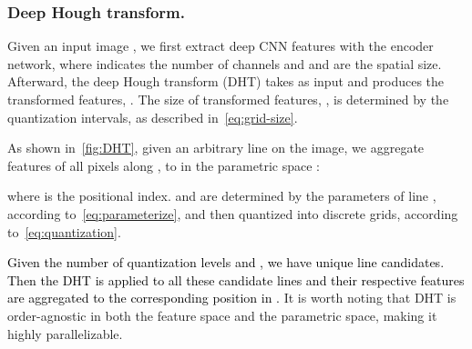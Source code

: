 \documentclass[10pt,journal,cspaper,compsoc]{IEEEtran}
\newcommand{\revise}[1]{{\textcolor{black}{#1}}}
\newcommand{\CheckRmv}[1]{}
\newcommand{\CheckRmv}[1]{#1}
\begin{document}
\CheckRmv{
\begin{figure*}[tb]
  \centering
  \hfill
  \subfigure[]{
    \label{fig:DHT}
    \begin{overpic}[height=.18\linewidth]{figures/dht.pdf}
\put(-5, 19){}
      \put(15, 33.3){}
\put(55, 19){}
      \put(75, 33.3){}
\put(20, 43){}
      \put(79, 43){}
      \put(76, 8){}
    \end{overpic}
  }\hfill
  \subfigure[]{
    \label{fig:nonlocal}
    \begin{overpic}[width=0.46\linewidth]{figures/nonlocal.pdf}
      \put(19, 39){}
      \put(-6, 20){}
      \put(80, 39){}
      \put(102, 20){}
      \put(45, 24){DHT}
      \put(45, 11){RHT}
      \put(6, -4){feature space}
      \put(65, -4){parametric space}
    \end{overpic}
  }\hfill
  \caption{
    (a): Features along a line in the feature space (blue, left) are
    accumulated to a point  in the parametric space (red, right).
    (b): Illustration of the proposed context-aware feature aggregation.
Features of nearby lines in the feature space (left)
    are translated into neighbor points in the parametric space (right).
In the parametric space, a simple  convolutional operation can
    easily capture contextual information for the central line (orange).
Best viewed in color.
  }
\end{figure*}
}

\subsubsection{Deep Hough transform.}
Given an input image ,  we first extract deep CNN features 
 with the encoder network,
where  indicates the number of channels and  and  are the spatial size.
Afterward, the deep Hough transform (DHT) takes  as input and produces
the transformed features, .
The size of transformed features, , is determined by the quantization intervals, as
described in~\cref{eq:grid-size}.

As shown in~\cref{fig:DHT},
given an arbitrary line  on the image,
we aggregate features of all pixels along ,
to  in the parametric space :

where  is the positional index.
 and  are determined by the parameters of line , according
to~\cref{eq:parameterize}, and then quantized into discrete grids, according to~\cref{eq:quantization}.

\revise{Given the number of quantization levels  and ,
we have  unique line candidates.
Then the DHT is applied to all these candidate lines and their respective features
are aggregated to the corresponding position in .}
It is worth noting that DHT is order-agnostic in both the feature space and the parametric space,
making it highly parallelizable.
\end{document}
